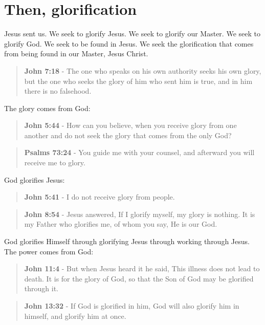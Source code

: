 \documentclass[11pt]{article}
\begin{document}
\section{Then, glorification}
\label{sec:org84ec70a}
Jesus sent us. We seek to glorify Jesus. We seek to glorify our Master.
We seek to glorify God. We seek to be found in Jesus. We seek the glorification that comes from being found in our Master, Jesus Christ.

\begin{quote}
\textbf{John 7:18} - The one who speaks on his own authority seeks his own glory, but the one who seeks the glory of him who sent him is true, and in him there is no falsehood.
\end{quote}

The glory comes from God:

\begin{quote}
\textbf{John 5:44} - How can you believe, when you receive glory from one another and do not seek the glory that comes from the only God?
\end{quote}

\begin{quote}
\textbf{Psalms 73:24} - You guide me with your counsel, and afterward you will receive me to glory.
\end{quote}

God glorifies Jesus:

\begin{quote}
\textbf{John 5:41} - I do not receive glory from people.
\end{quote}

\begin{quote}
\textbf{John 8:54} - Jesus answered, If I glorify myself, my glory is nothing. It is my Father who glorifies me, of whom you say, He is our God.
\end{quote}

God glorifies Himself through glorifying Jesus through working through Jesus. The power comes from God:

\begin{quote}
\textbf{John 11:4} - But when Jesus heard it he said, This illness does not lead to death. It is for the glory of God, so that the Son of God may be glorified through it.
\end{quote}

\begin{quote}
\textbf{John 13:32} - If God is glorified in him, God will also glorify him in himself, and glorify him at once.
\end{quote}
\end{document}

